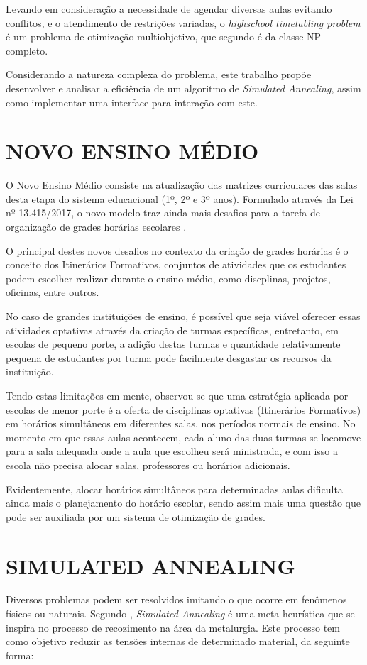 Levando em consideração a necessidade de agendar diversas aulas evitando conflitos, e o atendimento de restrições variadas, o \textit{highschool timetabling problem} é um problema de otimização multiobjetivo, que segundo  é da classe NP-completo.

Considerando a natureza complexa do problema, este trabalho propõe desenvolver e analisar a eficiência de um algoritmo de \textit{Simulated Annealing}, assim como implementar uma interface para interação com este.

\section{NOVO ENSINO MÉDIO}
\label{sec:novo_ensino_medio}
O Novo Ensino Médio consiste na atualização das matrizes curriculares das salas desta etapa do sistema educacional (1º, 2º e 3º anos). Formulado através da Lei nº 13.415/2017, o novo modelo traz ainda mais desafios para a tarefa de organização de grades horárias escolares \cite{lei13415}.

O principal destes novos desafios no contexto da criação de grades horárias é o conceito dos Itinerários Formativos, conjuntos de atividades que os estudantes podem escolher realizar durante o ensino médio, como discplinas, projetos, oficinas, entre outros.

No caso de grandes instituições de ensino, é possível que seja viável oferecer essas atividades optativas através da criação de turmas específicas, entretanto, em escolas de pequeno porte, a adição destas turmas e quantidade relativamente pequena de estudantes por turma pode facilmente desgastar os recursos da instituição.

Tendo estas limitações em mente, observou-se que uma estratégia aplicada por escolas de menor porte é a oferta de disciplinas optativas (Itinerários Formativos) em horários simultâneos em diferentes salas, nos períodos normais de ensino. No momento em que essas aulas acontecem, cada aluno das duas turmas se locomove para a sala adequada onde a aula que escolheu será ministrada, e com isso a escola não precisa alocar salas, professores ou horários adicionais. 

Evidentemente, alocar horários simultâneos para determinadas aulas dificulta ainda mais o planejamento do horário escolar, sendo assim mais uma questão que pode ser auxiliada por um sistema de otimização de grades.

\section{SIMULATED ANNEALING}
Diversos problemas podem ser resolvidos imitando o que ocorre em fenômenos físicos ou naturais. Segundo , \textit{Simulated Annealing} é uma meta-heurística que se inspira no processo de recozimento na área da metalurgia. Este processo tem como objetivo reduzir as tensões internas de determinado material, da seguinte forma:

